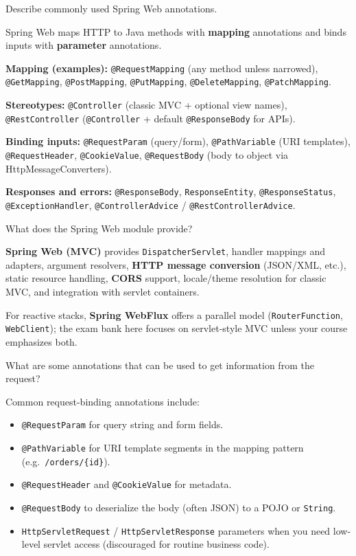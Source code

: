 \question[4]
Describe commonly used Spring Web annotations.
\begin{solutionorbox}[1.55in]
  Spring Web maps HTTP to Java methods with \textbf{mapping} annotations and binds inputs with \textbf{parameter} annotations.

  \noindent\textbf{Mapping (examples):} \texttt{@RequestMapping} (any method unless narrowed), \texttt{@GetMapping}, \texttt{@PostMapping}, \texttt{@PutMapping}, \texttt{@DeleteMapping}, \texttt{@PatchMapping}.

  \noindent\textbf{Stereotypes:} \texttt{@Controller} (classic MVC + optional view names), \texttt{@RestController} (\texttt{@Controller} + default \texttt{@ResponseBody} for APIs).

  \noindent\textbf{Binding inputs:} \texttt{@RequestParam} (query/form), \texttt{@PathVariable} (URI templates), \texttt{@RequestHeader}, \texttt{@CookieValue}, \texttt{@RequestBody} (body to object via HttpMessageConverters).

  \noindent\textbf{Responses and errors:} \texttt{@ResponseBody}, \texttt{ResponseEntity}, \texttt{@ResponseStatus}, \texttt{@ExceptionHandler}, \texttt{@ControllerAdvice} / \texttt{@RestControllerAdvice}.
\end{solutionorbox}

\question[4]
What does the Spring Web module provide?
\begin{solutionorbox}[1.2in]
  \textbf{Spring Web (MVC)} provides \texttt{DispatcherServlet}, handler mappings and adapters, argument resolvers, \textbf{HTTP message conversion} (JSON/XML, etc.), static resource handling, \textbf{CORS} support, locale/theme resolution for classic MVC, and integration with servlet containers.

  For reactive stacks, \textbf{Spring WebFlux} offers a parallel model (\texttt{RouterFunction}, \texttt{WebClient}); the exam bank here focuses on servlet-style MVC unless your course emphasizes both.
\end{solutionorbox}

\question[4]
What are some annotations that can be used to get information from the request?
\begin{solutionorbox}[1.35in]
  Common request-binding annotations include:
  \begin{itemize}
    \item \texttt{@RequestParam} for query string and form fields.
    \item \texttt{@PathVariable} for URI template segments in the mapping pattern (e.g.\ \texttt{/orders/\{id\}}).
    \item \texttt{@RequestHeader} and \texttt{@CookieValue} for metadata.
    \item \texttt{@RequestBody} to deserialize the body (often JSON) to a POJO or \texttt{String}.
    \item \texttt{HttpServletRequest} / \texttt{HttpServletResponse} parameters when you need low-level servlet access (discouraged for routine business code).
  \end{itemize}
\end{solutionorbox}

